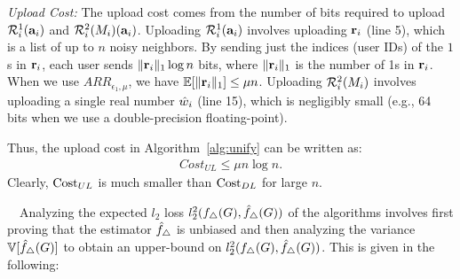 \textit{Upload Cost:}
The upload cost comes
from the number of bits required to upload $\mathcal{R}_i^1(\mathbf{a}_i)$ and
$\mathcal{R}_i^2(M_i)(\mathbf{a}_i)$.
Uploading $\mathcal{R}_i^1(\mathbf{a}_i)$ involves uploading
$\mathbf{r}_i$ (line 5), which is a list of up to $n$ noisy neighbors. By sending just
the indices (user IDs) of the $1$s in $\mathbf{r}_i$, each user sends $\|\mathbf{r}_i\|_1 \log n$ bits,
where $\|\mathbf{r}_i\|_1$ is the number of 1s in $\mathbf{r}_i$.
When we use $ARR_{\epsilon_1,\mu}$,
we have $\mathbb{E}[\|\mathbf{r}_i\|_1] \leq \mu n$.
% 
Uploading
$\mathcal{R}_i^2(M_i)$
involves uploading a single real number $\hat{w}_i$ (line 15), which is negligibly small (e.g., 64 bits when we use a double-precision floating-point).

Thus,
the upload cost in Algorithm~\ref{alg:unify} can be written as:
%
\begin{align}
  Cost_{UL} \leq \mu n \log n.
\label{eq:CostUL_proposal}
\end{align}
Clearly, 
$\mathrm{Cost}_{UL}{}$ 
is much smaller than 
$\mathrm{Cost}_{DL}{}$ 
for large $n$.

\smallskip
{}~~Analyzing the expected $l_2$ loss $l_2^2(f_\triangle(G), \hat{f}_\triangle(G))$ of the algorithms involves first proving that
the estimator $\hat{f}_\triangle$ is unbiased
and then
analyzing
the
variance $\mathbb{V}[\hat{f}_\triangle(G)]$ to obtain an upper-bound on
$l_2^2(f_\triangle(G), \hat{f}_\triangle(G))$.
This is given in the following:

